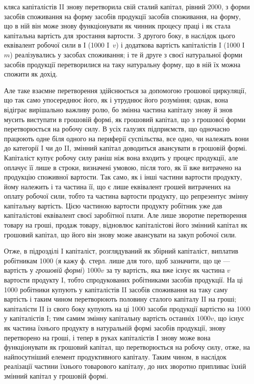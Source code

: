 \parcont{}  %
кляса капіталістів II знову перетворила свій сталий капітал, рівний 2000,
з форми засобів споживання на форму засобів продукції засобів споживання,
на форму, що в ній він може знову функціонувати як чинник
процесу праці і як стала капітальна вартість для зростання вартости. З
другого боку, в наслідок цього еквівалент робочої сили в І (1000 I~$v$)
і додаткова вартість капіталістів I (1000 І~$m$) реалізувались у засобах
споживання; і те й друге з своєї натуральної форми засобів продукції перетворилися
на таку натуральну форму, що в ній їх можна спожити як дохід.

Але таке взаємне перетворення здійснюється за допомогою грошової
циркуляції, що так само упосереднює його, як і утруднює його розуміння;
однак, вона відіграє вирішально важливу ролю, бо змінна частина капіталу
знову й знов мусить виступати в грошовій формі, як грошовий капітал,
що з грошової форми перетворюється на робочу силу. В усіх галузях
підприємств, що одночасно працюють одне біля одного на периферії
суспільства, все одно, чи належать вони до категорії I чи до II, змінний
капітал доводиться авансувати в грошовій формі. Капіталіст купує
робочу силу раніш ніж вона входить у процес продукції, але оплачує її
лише в строки, визначені умовою, після того, як її вже витрачено на
продукцію споживної вартости. Так само, як і інші частини вартости
продукту, йому належить і та частина її, що є лише еквівалент грошей
витрачених на оплату робочої сили, тобто та частина вартости продукту,
що репрезентує змінну капітальну вартість. Цією частиною вартости продукту
робітник уже дав капіталістові еквівалент своєї заробітної плати. Але
лише зворотне перетворення товару на гроші, продаж товару, відновлює
капіталістові його змінний капітал як грошовий капітал, що його він
знову може авансувати на закуп робочої сили.

Отже, в підрозділі I капіталіст, розглядуваний як збірний капіталіст,
виплатив робітникам 1000 (я кажу ф. стерл. лише для того,
щоб зазначити, що це — вартість у \emph{грошовій формі}) \deq{} $1000v$ за
ту вартість, яка вже існує як частина $v$ вартости продукту I, тобто спродукованих
робітниками засобів продукції. На ці 1000 робітники
купують у капіталістів II засобів споживання на таку саму вартість і таким
чином перетворюють половину сталого капіталу II на гроші; капіталісти II
із свого боку купують на ці 1000 засоби продукції вартістю
на 1000 у капіталістів I; тим самим змінну капітальну вартість останніх
\deq{} $1000 v$, що існує як частина їхнього продукту в натуральній формі
засобів продукції, знову перетворено на гроші, і тепер в руках капіталістів
І знову може вона функціонувати як грошовий капітал, що перетворюється
на робочу силу, отже, на найпосутніший елемент продуктивного
капіталу. Таким чином, в наслідок реалізації частини їхнього товарового
капіталу, до них зворотно припливає їхній змінний капітал у
грошовій формі.

